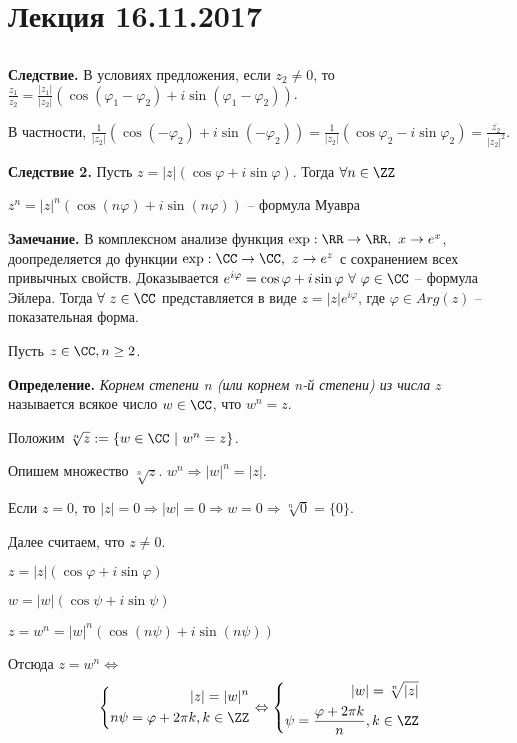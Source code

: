 \section{Лекция 16.11.2017}

\subsection{}

\textbf{Следствие.} В условиях предложения, если $z_2 \neq 0$, то $\frac{z_1}{z_2} = \frac{|z_1|}{|z_2|} (\cos (\varphi_1 - \varphi_2) + i \sin(\varphi_1 - \varphi_2))$.

\bigskip
В частности, $\frac{1}{|z_2|}(\cos(- \varphi_2) + i\sin(- \varphi_2)) = \frac{1}{|z_2|}(\cos \varphi_2 - i \sin \varphi_2) = \frac{\overline{z_2}}{|z_2|^2}$.

\bigskip
\textbf{Следствие 2.} Пусть $z = |z|(\cos \varphi + i \sin \varphi)$. Тогда $\forall n \in \ZZ$

\bigskip
$z^n = |z|^n (\cos(n \varphi) + i \sin(n \varphi))$ -- формула Муавра

\bigskip
\textbf{Замечание.} В комплексном анализе функция $\exp: \RR \rightarrow \RR, \ x \rightarrow e^x$, доопределяется до функции $\exp: \CC \rightarrow \CC, \ z \rightarrow e^z$ с сохранением всех привычных свойств. Доказывается $e^{i \varphi} = \cos \varphi + i \sin \varphi \ \forall \ \varphi \in \CC$ -- формула Эйлера. Тогда $\forall \ z \in \CC$ представляется в виде $z = |z| e^{i \varphi}$, где $\varphi \in Arg(z)$ -- показательная форма.

\bigskip
Пусть $z \in \CC, n \geq 2$.

\textbf{Определение.} \textit{Корнем степени n (или корнем n-й степени) из числа} $z$ называется всякое число $w \in \CC$, что $w^n = z$.

Положим $\sqrt[n]{z} := \{w \in \CC \ | \ w^n = z \}$.

\bigskip
Опишем множество $\sqrt[n]{z}$.
$w^n \Rightarrow |w|^n = |z|$.

Если $z = 0$, то $|z| = 0 \Rightarrow |w| = 0 \Rightarrow w = 0 \Rightarrow \sqrt[n]{0} = \{ 0 \}$. 

Далее считаем, что $z \neq 0$.

$z = |z|(\cos \varphi + i \sin \varphi)$

$w = |w|(\cos \psi + i \sin \psi)$

$z = w^n = |w|^n (\cos (n \psi) + i \sin (n \psi))$

Отсюда $z = w^n \Leftrightarrow$ \begin{equation*}
	\left\{
		\begin{aligned}
			|z| = |w|^n  \\
			n \psi = \varphi + 2 \pi k, k \in \ZZ 
		\end{aligned}
	\right. \Leftrightarrow \left\{
		\begin{aligned}
			|w| = \sqrt[n]{|z|}  \\
			\psi = \frac{\varphi + 2 \pi k}{n}, k \in \ZZ
		\end{aligned}
	\right.
\end{equation*}

